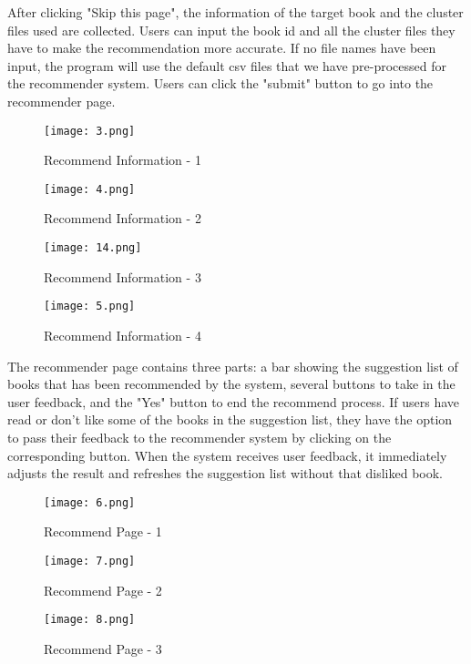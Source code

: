 \documentclass[fontsize=11pt]{article}
\begin{document}
\qquad After clicking "Skip this page", the information of the target book and the cluster files used are collected. Users can input the book id and all the cluster files they have to make the recommendation more accurate. If no file names have been input, the program will use the default csv files that we have pre-processed for the recommender system. Users can click the "submit" button to go into the recommender page. 

\begin{figure}[h]
   \begin{minipage}{0.24\textwidth}
     \centering
     \texttt{[image: 3.png]}
     \caption{Recommend Information - 1}\label{Fig:Data1}
   \end{minipage}\hfill
   \begin{minipage}{0.24\textwidth}
     \centering
     \texttt{[image: 4.png]}
     \caption{Recommend Information - 2}\label{Fig:Data2}
   \end{minipage}
   \begin{minipage}{0.24\textwidth}
     \centering
     \texttt{[image: 14.png]}
     \caption{Recommend Information - 3}\label{Fig:Data2}
   \end{minipage}
   \begin{minipage}{0.24\textwidth}
     \centering
     \texttt{[image: 5.png]}
     \caption{Recommend Information - 4}\label{Fig:Data2}
   \end{minipage}

\end{figure}

\qquad The recommender page contains three parts: a bar showing the suggestion list of books that has been recommended by the system, several buttons to take in the user feedback, and the "Yes" button to end the recommend process. If users have read or don't like some of the books in the suggestion list, they have the option to pass their feedback to the recommender system by clicking on the corresponding button. When the system receives user feedback, it immediately adjusts the result and refreshes the suggestion list without that disliked book.

\begin{figure}[h]
   \begin{minipage}{0.33\textwidth}
     \centering
     \texttt{[image: 6.png]}
     \caption{Recommend Page - 1}\label{Fig:Data1}
   \end{minipage}\hfill
   \begin{minipage}{0.33\textwidth}
     \centering
     \texttt{[image: 7.png]}
     \caption{Recommend Page - 2}\label{Fig:Data2}
   \end{minipage}
   \begin{minipage}{0.33\textwidth}
     \centering
     \texttt{[image: 8.png]}
     \caption{Recommend Page - 3}\label{Fig:Data2}
   \end{minipage}

\end{figure}
\end{document}
